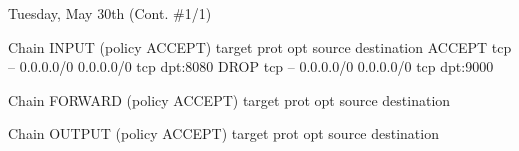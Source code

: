 \documentclass[11pt]{article}
\begin{document}
\newpage
\begin{bloodorangebox}{Tuesday, May 30th (Cont. \#1/1)\vspace{-2em}\begin{flushright}\large{}\end{flushright}}
\begin{ubuntu}
Chain INPUT (policy ACCEPT)
target     prot opt source               destination         
ACCEPT     tcp  --  0.0.0.0/0            0.0.0.0/0            tcp dpt:8080
DROP       tcp  --  0.0.0.0/0            0.0.0.0/0            tcp dpt:9000

Chain FORWARD (policy ACCEPT)
target     prot opt source               destination         

Chain OUTPUT (policy ACCEPT)
target     prot opt source               destination    
\end{ubuntu}


\end{bloodorangebox}
\end{document}
